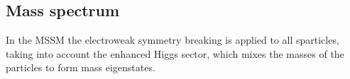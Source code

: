 	\subsection*{Mass spectrum}
%		
	In the \ac{MSSM} the electroweak symmetry breaking is applied to all sparticles, taking into account the enhanced Higgs sector, which mixes the masses of the particles to form mass eigenstates.  
